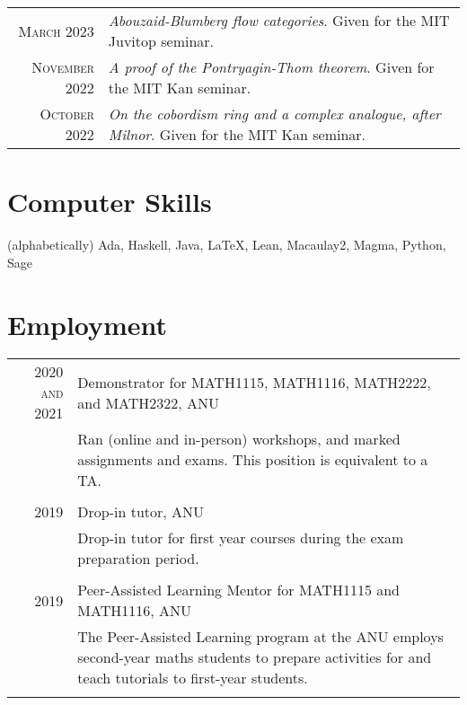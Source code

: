 \documentclass[a4paper,10pt]{article} %
\begin{document}
\begin{tabular}{rl}

\textsc{March} 2023 & \emph{Abouzaid-Blumberg flow categories}. Given for the MIT Juvitop seminar.\\

\textsc{November} 2022 & \emph{A proof of the Pontryagin-Thom theorem}. Given for the MIT Kan seminar.\\

\textsc{October} 2022 & \emph{On the cobordism ring and a complex analogue, after Milnor}. Given for the MIT Kan seminar.

\end{tabular}



\section{Computer Skills}

(alphabetically) Ada, Haskell, Java, {\fb \LaTeX}, Lean, Macaulay2, Magma, Python, Sage


\section{Employment}

\begin{tabular}{r|p{12cm}}

\textsc{2020 and 2021} & Demonstrator for \textsc{MATH1115, MATH1116, MATH2222}, and \textsc{MATH2322}, ANU \emph{}\\
& \footnotesize{Ran (online and in-person) workshops, and marked assignments and exams. This position is equivalent to a TA.}\\
\multicolumn{2}{c}{} \\


\textsc{2019} & Drop-in tutor, ANU \emph{}\\
& \footnotesize{Drop-in tutor for first year courses during the exam preparation period.}\\
\multicolumn{2}{c}{} \\


\textsc{2019} & Peer-Assisted Learning Mentor for \textsc{MATH1115} and \textsc{MATH1116}, ANU \emph{}\\
& \footnotesize{The Peer-Assisted Learning program at the ANU employs second-year maths students to prepare activities for and teach tutorials to first-year students.}\\
\multicolumn{2}{c}{} \\

\end{tabular}
\end{document}
